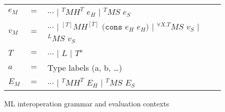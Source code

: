 \begin{figure}[p]
\centering
\begin{tabular}{lcl}
\vspace{5pt}

$e_{M}$ & $=$ & $\cdots$ $\vert$ $^{T}MH^{T}$ $e_{H}$ $\vert$ $^{T}MS$ $e_{S}$ \\

\vspace{5pt}

$v_{M}$ & $=$ & $\cdots$ $\vert$ $^{[T]}MH^{[T]}$ $(\mathtt{cons}$ $e_{H}$ $e_{H})$ $\vert$ $^{\forall X.T}MS$ $v_{S}$ $\vert$ $^{L}MS$ $v_{S}$ \\

\vspace{5pt}

$T$ & $=$ & $\cdots$ $\vert$ $L$ $\vert$ $T^{a}$ \\

\vspace{5pt}

$a$ & $=$ & Type labels (a, b, \ldots) \\

\vspace{5pt}

$E_{M}$ & $=$ & $\cdots$ $\vert$ $^{T}MH^{T}$ $E_{H}$ $\vert$ $^{T}MS$ $E_{S}$
\end{tabular}
\caption{ML interoperation grammar and evaluation contexts}
\label{img}
\end{figure}